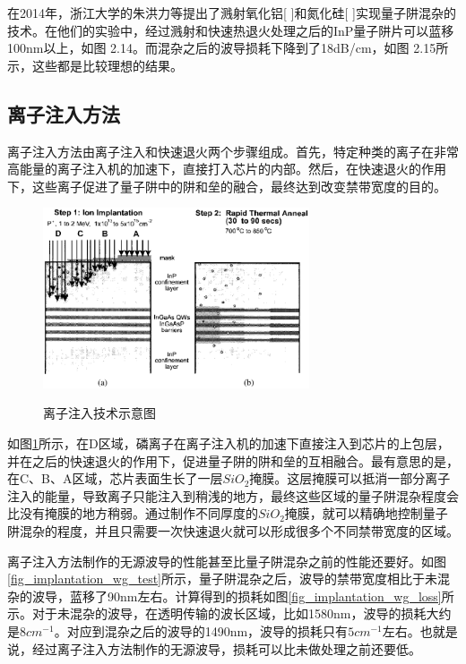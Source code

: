 \documentclass[oneside]{ZJUthesis}
\begin{document}
在2014年，浙江大学的朱洪力等提出了溅射氧化铝[ ]和氮化硅[ ]实现量子阱混杂的技术。在他们的实验中，经过溅射和快速热退火处理之后的InP量子阱片可以蓝移100nm以上，如图 2.14。而混杂之后的波导损耗下降到了18dB/cm，如图 2.15所示，这些都是比较理想的结果。

\subsection{离子注入方法}

离子注入方法由离子注入和快速退火两个步骤组成。首先，特定种类的离子在非常高能量的离子注入机的加速下，直接打入芯片的内部。然后，在快速退火的作用下，这些离子促进了量子阱中的阱和垒的融合，最终达到改变禁带宽度的目的。

\begin{figure}[!h]
  \centering
  \includegraphics[width=0.7\textwidth]{./Pictures/implantation.eps}\\
  \caption{离子注入技术示意图}
  \label{fig_implantation}
\end{figure}

如图\ref{fig_implantation}所示，在D区域，磷离子在离子注入机的加速下直接注入到芯片的上包层，并在之后的快速退火的作用下，促进量子阱的阱和垒的互相融合。最有意思的是，在C、B、A区域，芯片表面生长了一层$SiO_2$掩膜。这层掩膜可以抵消一部分离子注入的能量，导致离子只能注入到稍浅的地方，最终这些区域的量子阱混杂程度会比没有掩膜的地方稍弱。通过制作不同厚度的$SiO_2$掩膜，就可以精确地控制量子阱混杂的程度，并且只需要一次快速退火就可以形成很多个不同禁带宽度的区域。

离子注入方法制作的无源波导的性能甚至比量子阱混杂之前的性能还要好。如图\ref{fig_implantation_wg_test}所示，量子阱混杂之后，波导的禁带宽度相比于未混杂的波导，蓝移了90nm左右。计算得到的损耗如图\ref{fig_implantation_wg_loss}所示。对于未混杂的波导，在透明传输的波长区域，比如1580nm，波导的损耗大约是$8cm^{-1}$。对应到混杂之后的波导的1490nm，波导的损耗只有$5cm^{-1}$左右。也就是说，经过离子注入方法制作的无源波导，损耗可以比未做处理之前还要低。
\end{document}
